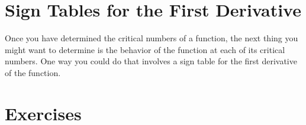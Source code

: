 \documentclass[12pt,]{book}
\theoremstyle{plain}
\theoremstyle{definition}
\numberwithin{equation}{section}
\begin{document}
\typeout{************************************************}
\typeout{************************************************}
\section[Sign Tables for the First Derivative]{Sign Tables for the First Derivative}\label{section-sign-tables-for-the-first-derivative}
Once you have determined the critical numbers of a function, the next thing you might want to determine is the behavior of the function at each of its critical numbers.  One way you could do that involves a sign table for the first derivative of the function.%
\typeout{************************************************}
\typeout{************************************************}
\section*{Exercises}\label{exercises-4}
\end{document}

